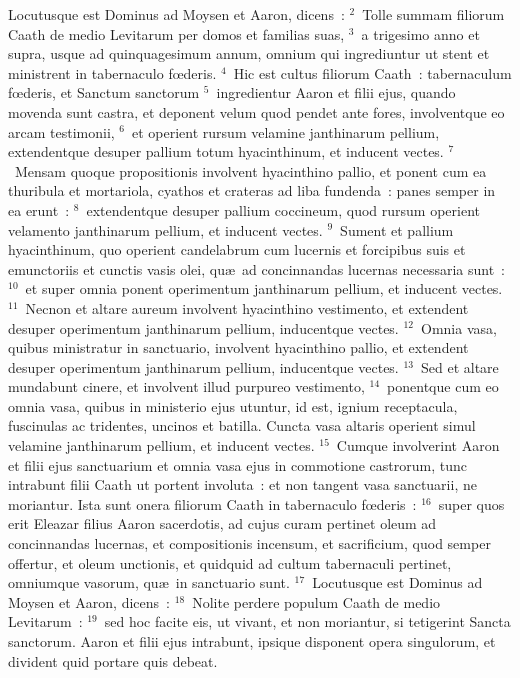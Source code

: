 \lettrine[lines=3,image=true,loversize=0.05,lraise=-0.03]{L}{}ocutusque est Dominus ad Moysen et Aaron, dicens~:
${}^{2}$~Tolle summam filiorum Caath de medio Levitarum per domos et familias suas,
${}^{3}$~a trigesimo anno et supra, usque ad quinquagesimum annum, omnium qui ingrediuntur ut stent et ministrent in tabernaculo fœderis.
${}^{4}$~Hic est cultus filiorum Caath~: tabernaculum fœderis, et Sanctum sanctorum
${}^{5}$~ingredientur Aaron et filii ejus, quando movenda sunt castra, et deponent velum quod pendet ante fores, involventque eo arcam testimonii,
${}^{6}$~et operient rursum velamine janthinarum pellium, extendentque desuper pallium totum hyacinthinum, et inducent vectes.
${}^{7}$~Mensam quoque propositionis involvent hyacinthino pallio, et ponent cum ea thuribula et mortariola, cyathos et crateras ad liba fundenda~: panes semper in ea erunt~:
${}^{8}$~extendentque desuper pallium coccineum, quod rursum operient velamento janthinarum pellium, et inducent vectes.
${}^{9}$~Sument et pallium hyacinthinum, quo operient candelabrum cum lucernis et forcipibus suis et emunctoriis et cunctis vasis olei, qu\ae\ ad concinnandas lucernas necessaria sunt~:
${}^{10}$~et super omnia ponent operimentum janthinarum pellium, et inducent vectes.
${}^{11}$~Necnon et altare aureum involvent hyacinthino vestimento, et extendent desuper operimentum janthinarum pellium, inducentque vectes.
${}^{12}$~Omnia vasa, quibus ministratur in sanctuario, involvent hyacinthino pallio, et extendent desuper operimentum janthinarum pellium, inducentque vectes.
${}^{13}$~Sed et altare mundabunt cinere, et involvent illud purpureo vestimento,
${}^{14}$~ponentque cum eo omnia vasa, quibus in ministerio ejus utuntur, id est, ignium receptacula, fuscinulas ac tridentes, uncinos et batilla. Cuncta vasa altaris operient simul velamine janthinarum pellium, et inducent vectes.
${}^{15}$~Cumque involverint Aaron et filii ejus sanctuarium et omnia vasa ejus in commotione castrorum, tunc intrabunt filii Caath ut portent involuta~: et non tangent vasa sanctuarii, ne moriantur. Ista sunt onera filiorum Caath in tabernaculo fœderis~:
${}^{16}$~super quos erit Eleazar filius Aaron sacerdotis, ad cujus curam pertinet oleum ad concinnandas lucernas, et compositionis incensum, et sacrificium, quod semper offertur, et oleum unctionis, et quidquid ad cultum tabernaculi pertinet, omniumque vasorum, qu\ae\ in sanctuario sunt.
${}^{17}$~Locutusque est Dominus ad Moysen et Aaron, dicens~:
${}^{18}$~Nolite perdere populum Caath de medio Levitarum~:
${}^{19}$~sed hoc facite eis, ut vivant, et non moriantur, si tetigerint Sancta sanctorum. Aaron et filii ejus intrabunt, ipsique disponent opera singulorum, et divident quid portare quis debeat.
